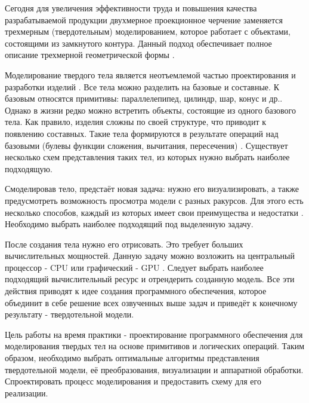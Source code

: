 \Introduction
Сегодня для увеличения эффективности труда и повышения качества разрабатываемой продукции двухмерное проекционное черчение заменяется трехмерным (твердотельным) моделированием, которое работает с объектами, состоящими из замкнутого контура. 
Данный подход обеспечивает полное описание трехмерной геометрической формы \cite{sapr}.

Моделирование твердого тела является неотъемлемой частью проектирования и разработки изделий \cite{article:solid_modeling}. 
Все тела можно разделить на базовые и составные. К базовым относятся примитивы: параллелепипед, цилиндр, шар, конус и др..
Однако в жизни редко можно встретить объекты, состоящие из одного базового тела. Как правило, изделия сложны по своей структуре, что приводит к появлению составных.
Такие тела формируются в результате операций над базовыми (булевы функции сложения, вычитания, пересечения) \cite{sapr}.
Существует несколько схем представления таких тел, из которых нужно выбрать наиболее подходящую.


Смоделировав тело, предстаёт новая задача: нужно его визуализировать, а также предусмотреть возможность просмотра модели с разных ракурсов. Для этого есть несколько способов, каждый из которых имеет свои преимущества и недостатки \cite{article:3d}. 
Необходимо выбрать наиболее подходящий под выделенную задачу. 


После создания тела нужно его отрисовать. Это требует больших вычислительных мощностей. 
Данную задачу можно возложить на центральный процессор - CPU или графический - GPU \cite{cpu_or_gpu}. Следует выбрать наиболее подходящий вычислительный ресурс и отрендерить созданную модель. 
Все эти действия приводят к идее создания программного обеспечения, которое объединит в себе решение всех озвученных выше задач и приведёт к конечному результату - твердотельной модели.

Цель работы на время практики - проектирование программного обеспечения для моделирования твердых тел на основе примитивов и логических операций. 
Таким образом, необходимо выбрать оптимальные алгоритмы представления твердотельной модели, её преобразования, 
визуализации и аппаратной обработки. 
Спроектировать процесс моделирования и предоставить схему для его реализации.

